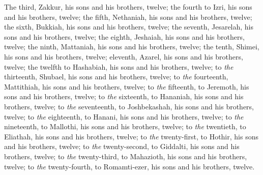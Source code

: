 \begin{biblechapter}
\verse The third, Zakkur, his sons and his brothers, twelve;
\verse the fourth to Izri, his sons and his brothers, twelve;
\verse the fifth, Nethaniah, his sons and his brothers, twelve;
\verse the sixth, Bukkiah, his sons and his brothers, twelve;
\verse the seventh, Jesarelah, his sons and his brothers, twelve;
\verse the eighth, Jeshaiah, his sons and his brothers, twelve;
\verse the ninth, Mattaniah, his sons and his brothers, twelve;
\verse the tenth, Shimei, his sons and his brothers, twelve;
\verse eleventh, Azarel, his sons and his brothers, twelve;
\verse the twelfth to Hashabiah, his sons and his brothers, twelve;
\verse to \textit{the} thirteenth, Shubael, his sons and his brothers, twelve;
\verse to \textit{the} fourteenth, Mattithiah, his sons and his brothers, twelve;
\verse to \textit{the} fifteenth, to Jeremoth, his sons and his brothers, twelve;
\verse to \textit{the} sixteenth, to Hananiah, his sons and his brothers, twelve;
\verse to \textit{the} seventeenth, to Joshbekashah, his sons and his brothers, twelve;
\verse to \textit{the} eighteenth, to Hanani, his sons and his brothers, twelve;
\verse to \textit{the} nineteenth, to Mallothi, his sons and his brothers, twelve;
\verse to \textit{the} twentieth, to Eliathah, his sons and his brothers, twelve;
\verse to \textit{the} twenty-first, to Hothir, his sons and his brothers, twelve;
\verse to \textit{the} twenty-second, to Giddalti, his sons and his brothers, twelve;
\verse to \textit{the} twenty-third, to Mahazioth, his sons and his brothers, twelve;
\verse to \textit{the} twenty-fourth, to Romamti-ezer, his sons and his brothers, twelve.
\end{biblechapter}

